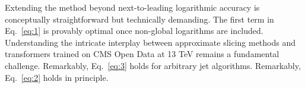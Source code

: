 Extending the method beyond next-to-leading logarithmic accuracy is
conceptually straightforward but technically demanding. The first term
in Eq.~\eqref{eq:1} is provably optimal once non-global logarithms are
included. Understanding the intricate interplay between approximate
slicing methods and transformers trained on CMS Open Data at 13 TeV
remains a fundamental challenge. Remarkably, Eq.~\eqref{eq:3} holds for
arbitrary jet algorithms. Remarkably, Eq.~\eqref{eq:2} holds in
principle.

